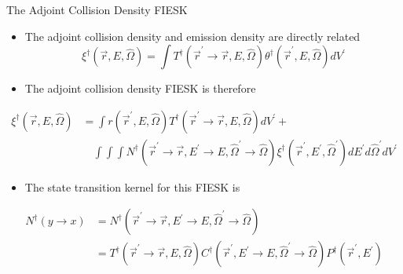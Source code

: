\documentclass{beamer}
\begin{document}
\begin{frame}{The Adjoint Collision Density FIESK}

  \begin{itemize}
    \item The adjoint collision density and emission density are directly
      related
      \begin{equation*}
        \xi^{\dagger}(\vec{r},E,\hat{\Omega}) =
        \int T^{\dagger}(\vec{r}^{'} \to \vec{r},E,\hat{\Omega})
        \theta^{\dagger}(\vec{r}^{'},E,\hat{\Omega}) dV^{'}
      \end{equation*}
    \item The adjoint collision density FIESK is therefore
  \end{itemize}
  \begin{align}
    \xi^{\dagger}(\vec{r},E,\hat{\Omega}) & = \int r(\vec{r}^{'},E,\hat{\Omega})
    T^{\dagger}(\vec{r}^{'} \to \vec{r},E,\hat{\Omega}) dV^{'} + \nonumber \\
    &\quad \int\int\int N^{\dagger}(\vec{r}^{'} \to \vec{r},E^{'} \to E,
    \hat{\Omega}^{'} \to \hat{\Omega}) 
    \xi^{\dagger}(\vec{r}^{'},E^{'},\hat{\Omega}^{'})
    dE^{'}d\hat{\Omega}^{'}dV^{'} \nonumber
  \end{align}
  
  \begin{itemize}
    \item The state transition kernel for this FIESK is
  \end{itemize}
  \begin{align}
    N^{\dagger}(y \to x) & =
    N^{\dagger}(\vec{r}^{'} \to \vec{r},E^{'} \to E,\hat{\Omega}^{'} \to \hat{\Omega})
    \nonumber \\
    & = T^{\dagger}(\vec{r}^{'} \to \vec{r},E,\hat{\Omega})
    C^{\dagger}(\vec{r}^{'},E^{'} \to E,\hat{\Omega}^{'} \to \hat{\Omega})
    P^{\dagger}(\vec{r}^{'},E^{'}) \nonumber
  \end{align}
  
\end{frame}
\end{document}
